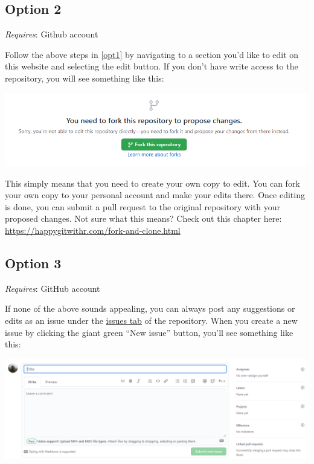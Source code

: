 \documentclass[
]{book}
\begin{document}
\hypertarget{opt2}{%
\subsection{Option 2}\label{opt2}}

\emph{Requires}: Github account

Follow the above steps in \ref{opt1} by navigating to a section you'd like to edit on this website and selecting the edit button. If you don't have write access to the repository, you will see something like this:

\begin{center}\includegraphics[width=1\linewidth]{img/editme3} \end{center}

This simply means that you need to create your own copy to edit. You can fork your own copy to your personal account and make your edits there. Once editing is done, you can submit a pull request to the original repository with your proposed changes. Not sure what this means? Check out this chapter here: \url{https://happygitwithr.com/fork-and-clone.html}

\hypertarget{opt3}{%
\subsection{Option 3}\label{opt3}}

\emph{Requires}: GitHub account

If none of the above sounds appealing, you can always post any suggestions or edits as an issue under the \href{https://github.com/tbep-tech/data-management-sop/issues}{issues tab} of the repository. When you create a new issue by clicking the giant green ``New issue'' button, you'll see something like this:

\begin{center}\includegraphics[width=1\linewidth]{img/issues} \end{center}
\end{document}
